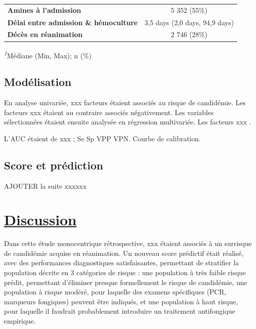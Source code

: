 \documentclass[
  french,
  letterpaper,
  DIV=11,
  numbers=noendperiod,
  justified]{scrartcl}
\begin{document}
\begin{table}
\begin{tabular*}{\linewidth}{@{\extracolsep{\fill}}lc}
{\bfseries Amines à l'admission} & 5 352 (55\%) \\
{\bfseries Délai entre admission \& hémoculture} & 3,5 days (2,0 days, 94,9 days) \\
{\bfseries Décès en réanimation} & 2 746 (28\%) \\
\bottomrule
\end{tabular*}
\begin{minipage}{\linewidth}
\vspace{.05em}
\textsuperscript{\textit{1}}Médiane (Min, Max); n (\%)\\
\end{minipage}
\end{table}

\subsection{Modélisation}\label{moduxe9lisation}

En analyse univariée, xxx facteurs étaient associés au risque de
candidémie. Les facteurs xxx étaient au contraire associés négativement.
Les variables sélectionnées étaient ensuite analysée en régression
multivariée. Les facteurs xxx .

L'AUC étaient de xxx ; Se Sp VPP VPN. Courbe de calibration.

\subsection{Score et prédiction}\label{score-et-pruxe9diction}

AJOUTER la suite xxxxxx

\section{\texorpdfstring{\ul{Discussion}}{Discussion}}\label{discussion}

Dans cette étude monocentrique rétrospective, xxx étaient associés à un
surrisque de candidémie acquise en réanimation. Un nouveau score
prédictif était réalisé, avec des performances diagnostiques
satisfaisantes, permettant de stratifier la population décrite en 3
catégories de risque : une population à très faible risque prédit,
permettant d'éliminer presque formellement le risque de candidémie, une
population à risque modéré, pour laquelle des examens spécifiques (PCR,
marqueurs fongiques) peuvent être indiqués, et une population à haut
risque, pour laquelle il faudrait probablement introduire un traitement
antifongique empirique.
\end{document}

